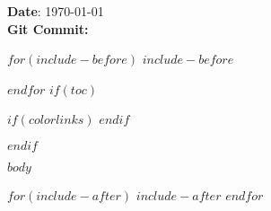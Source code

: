 \documentclass[10pt,openright]{$documentclass$}
\date{$date$}
\begin{document}




\textbf{Date}: \today \\
\textbf{Git Commit:} \texttt{}

\newpage


$for(include-before)$
$include-before$

$endfor$
$if(toc)$
{
$if(colorlinks)$
\hypersetup{linkcolor=$if(toccolor)$$toccolor$$else$black$endif$}
$endif$
\setcounter{tocdepth}{$toc-depth$}
\tableofcontents

\newpage

}
$endif$


$body$


$for(include-after)$
$include-after$
$endfor$


\newpage


\end{document}

